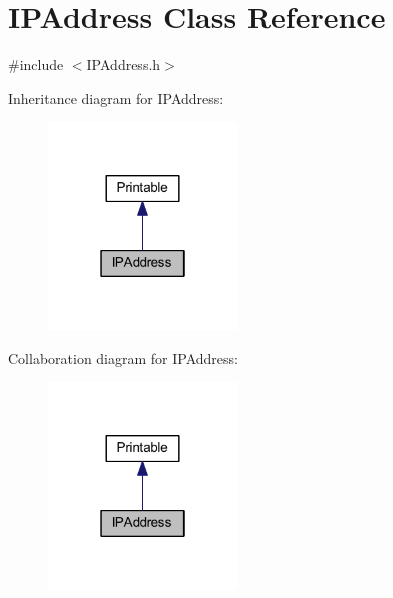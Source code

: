 \hypertarget{class_i_p_address}{}\section{I\+P\+Address Class Reference}
\label{class_i_p_address}


{\ttfamily \#include $<$I\+P\+Address.\+h$>$}



Inheritance diagram for I\+P\+Address\+:\nopagebreak
\begin{figure}[H]
\begin{center}
\leavevmode
\includegraphics[width=142pt]{class_i_p_address__inherit__graph}
\end{center}
\end{figure}


Collaboration diagram for I\+P\+Address\+:\nopagebreak
\begin{figure}[H]
\begin{center}
\leavevmode
\includegraphics[width=142pt]{class_i_p_address__coll__graph}
\end{center}
\end{figure}
